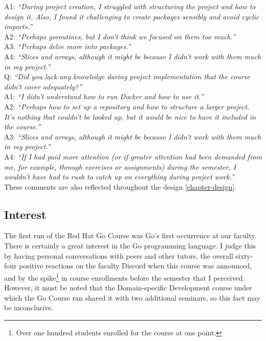 \documentclass[
  digital,
  color,
  oneside,
  nosansbold,
  nocolorbold,
  nolof,
  nolot,
]{fithesis4}
\begin{document}
\noindent
A1: \textit{\enquote{During project creation, I struggled with structuring the project and how to design it. Also, I found it challenging to create packages sensibly and avoid cyclic imports.}} \\

\noindent
A2: \textit{\enquote{Perhaps goroutines, but I don't think we focused on them too much.}} \\

\noindent
A3: \textit{\enquote{Perhaps delve more into packages.}} \\

\noindent
A4: \textit{\enquote{Slices and arrays, although it might be because I didn't work with them much in my project.}} \\

\noindent
Q: \textit{\enquote{Did you lack any knowledge during project implementation that the course didn't cover adequately?}} \\

\noindent
A1: \textit{\enquote{I didn't understand how to run Docker and how to use it.}} \\

\noindent
A2: \textit{\enquote{Perhaps how to set up a repository and how to structure a larger project. It's nothing that couldn't be looked up, but it would be nice to have it included in the course.}} \\

\noindent
A3: \textit{\enquote{Slices and arrays, although it might be because I didn't work with them much in my project.}} \\

\noindent
A4: \textit{\enquote{If I had paid more attention (or if greater attention had been demanded from me, for example, through exercises or assignments) during the semester, I wouldn't have had to rush to catch up on everything during project work.}} \\

\noindent
These comments are also reflected throughout the design \cref{chapter-design}.

\subsection{Interest}

The first run of the Red Hat Go Course was Go's first occurrence at our faculty. There is certainly a great interest in the Go programming language. I judge this by having personal conversations with peers and other tutors, the overall sixty-four positive reactions on the faculty Discord when this course was announced, and by the spike\footnote{Over one hundred students enrolled for the course at one point.}
in course enrollments before the semester that I perceived. However, it must be noted that the Domain-specific Development course under which the Go Course ran shared it with two additional seminars, so this fact may be inconclusive.
\end{document}
